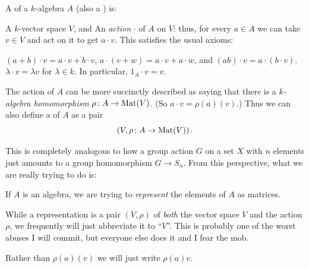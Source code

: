 \begin{definition}
	A  of a $k$-algebra $A$
	(also a ) is:
	\begin{enumerate}[(i)]
		\ii A $k$-vector space $V$, and
		\ii An \emph{action} $\cdot$ of $A$ on $V$: thus, for every $a \in A$
		we can take $v \in V$ and act on it to get $a \cdot v$.
		This satisfies the usual axioms:
		\begin{itemize}
			\ii $(a+b) \cdot v = a \cdot v + b \cdot v$,
			$a \cdot (v+w) = a \cdot v + a \cdot w$,
			and $(ab) \cdot v = a \cdot (b \cdot v)$.
			\ii $\lambda \cdot v = \lambda v$ for $\lambda \in k$.
			In particular, $1_A \cdot v = v$.
		\end{itemize}
	\end{enumerate}
\end{definition}

\begin{definition}
	The action of $A$ can be more succinctly described as saying
	that there is a \emph{$k$-algebra homomorphism} $\rho \colon A \to \mathrm{Mat}(V)$.
	(So $a \cdot v = \rho(a)(v)$.)
	Thus we can also define a  of $A$ as a pair
	\[ \left( V, \rho \colon A \to \mathrm{Mat}(V) \right). \]
\end{definition}
This is completely analogous to how a group action $G$ on a set $X$
with $n$ elements just amounts to a group homomorphism $G \to S_n$.
From this perspective, what we are really trying to do is:
\begin{moral}
	If $A$ is an algebra,
	we are trying to \emph{represent}
	the elements of $A$ as matrices.
\end{moral}

\begin{abuse}
	While a representation is a pair $(V, \rho)$
	of \emph{both} the vector space $V$ and the action $\rho$,
	we frequently will just abbreviate it to ``$V$''.
	This is probably one of the worst abuses I will commit,
	but everyone else does it and I fear the mob.
\end{abuse}
\begin{abuse}
	Rather than $\rho(a)(v)$ we will just write $\rho(a)v$.
\end{abuse}

